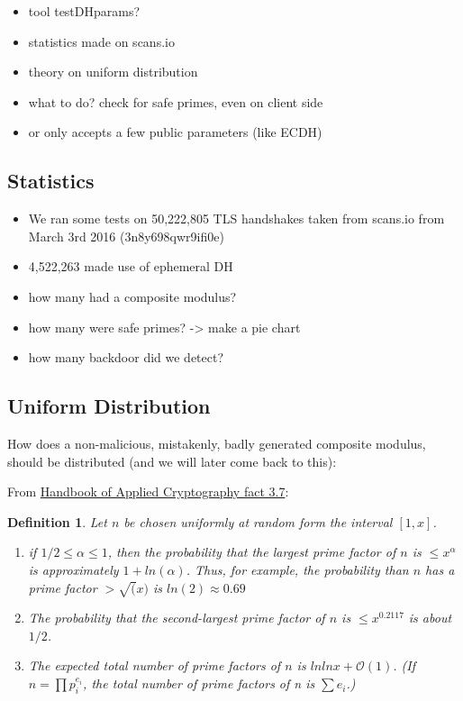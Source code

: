 \documentclass[a4paper,11pt,twocolumn]{article}
\newtheorem{definition}{Definition}
\begin{document}
\begin{itemize}
    \item tool testDHparams?
    \item statistics made on scans.io
    \item theory on uniform distribution
    \item what to do? check for safe primes, even on client side
    \item or only accepts a few public parameters (like ECDH)
\end{itemize}

\subsection{Statistics}

\begin{itemize}
    \item We ran some tests on 50,222,805 TLS handshakes taken from scans.io from March 3rd 2016 (3n8y698qwr9ifi0e)
    \item 4,522,263 made use of ephemeral DH
    \item how many had a composite modulus?
    \item how many were safe primes? -> make a pie chart
    \item how many backdoor did we detect?
\end{itemize}

\subsection{Uniform Distribution}

How does a non-malicious, mistakenly, badly generated composite modulus, should be distributed (and we will later come back to this):

From \href{http://cacr.uwaterloo.ca/hac/about/chap3.pdf}{Handbook of Applied Cryptography fact 3.7}:

\begin{definition}
    Let $n$ be chosen uniformly at random form the interval $[1, x]$.
    \begin{enumerate}
        \item if $1/2 \leq \alpha \leq 1$, then the probability that the largest prime factor of $n$ is $\leq x^{\alpha}$ is approximately $1+ ln(\alpha)$. Thus, for example, the probability than $n$ has a prime factor $> \sqrt(x)$ is $ln(2) \approx 0.69$
        \item The probability that the second-largest prime factor of $n$ is $\leq x^{0.2117}$ is about $1/2$. 
        \item The expected total number of prime factors of $n$ is $ln ln x + \mathcal{O}(1)$. (If $n = \prod p_i^{e_i}$, the total number of prime factors of n is $\sum e_i$.)
    \end{enumerate} 
\end{definition}
\end{document}
